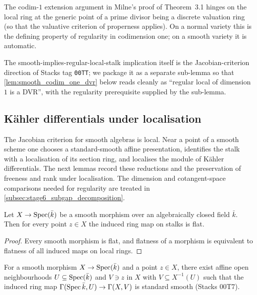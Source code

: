 The codim-\(1\) extension argument in Milne's proof of Theorem~3.1 hinges on the local
ring at the generic point of a prime divisor being a discrete valuation ring (so that
the valuative criterion of properness applies). On a normal variety this is the
defining property of regularity in codimension one; on a smooth variety it is automatic.

The smooth-implies-regular-local-stalk implication itself is the Jacobian-criterion
direction of Stacks tag \texttt{00TT}; we package it as a separate sub-lemma so that
\cref{lem:smooth_codim_one_dvr} below reads cleanly as ``regular local of dimension
\(1\) is a DVR'', with the regularity prerequisite supplied by the sub-lemma.

\subsection{K\"ahler differentials under localisation}
\label{subsec:kaehler_localisation_substrate}

The Jacobian criterion for smooth algebras is local.  Near a point of a smooth
scheme one chooses a standard-smooth affine presentation, identifies the stalk
with a localisation of its section ring, and localises the module of K\"ahler
differentials.  The next lemmas record these reductions and the preservation of
freeness and rank under localisation.  The dimension and cotangent-space
comparisons needed for regularity are treated in
\cref{subsec:stage6_subgap_decomposition}.

\begin{lemma}\leanok
  \label{lem:stalkMap_flat_of_smooth}
  Let \(X \to \operatorname{Spec}(\bar k)\) be a smooth morphism over an algebraically closed
  field \(\bar k\). Then for every point \(z \in X\) the induced ring map on
  stalks is flat.
\end{lemma}

\begin{proof}
  Every smooth morphism is flat, and flatness of a morphism is equivalent to
  flatness of all induced maps on local rings.
\end{proof}

\begin{lemma}\leanok
  \label{lem:exists_standardSmooth_at_of_smooth}
  For a smooth morphism \(X \to \operatorname{Spec}(\bar k)\) and a point \(z \in X\), there
  exist affine open neighbourhoods \(U \subseteq \operatorname{Spec}(\bar k)\) and \(V \ni z\)
  in \(X\) with \(V \subseteq X^{-1}(U)\) such that the induced ring map
  \(\Gamma(\operatorname{Spec} \bar k, U) \to \Gamma(X, V)\) is standard smooth (Stacks 00T7).
\end{lemma}

